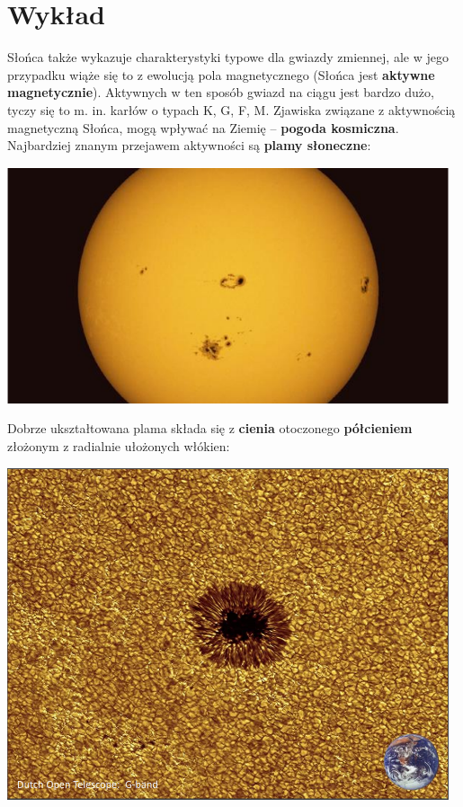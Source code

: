 \documentclass[../index.tex]{subfiles}
\begin{document}
    \section{Wykład}
        Słońca także wykazuje charakterystyki typowe dla gwiazdy zmiennej, ale w jego przypadku wiąże się to z ewolucją pola magnetycznego (Słońca jest \textbf{aktywne magnetycznie}). Aktywnych w ten sposób gwiazd na ciągu jest bardzo dużo, tyczy się to m. in. karłów o typach K, G, F, M. Zjawiska związane z aktywnością magnetyczną Słońca, mogą wpływać na Ziemię – \textbf{pogoda kosmiczna}.\\
        Najbardziej znanym przejawem aktywności są \textbf{plamy słoneczne}:
        \begin{center}
            \includegraphics[width=13cm]{images/plamaSloneczna.png}
        \end{center}
        Dobrze ukształtowana plama składa się z \textbf{cienia} otoczonego \textbf{półcieniem} złożonym z radialnie ułożonych włókien:
        \begin{center}
            \includegraphics[width=13cm]{images/plamaSloneczna2.png}
        \end{center}
\end{document}
